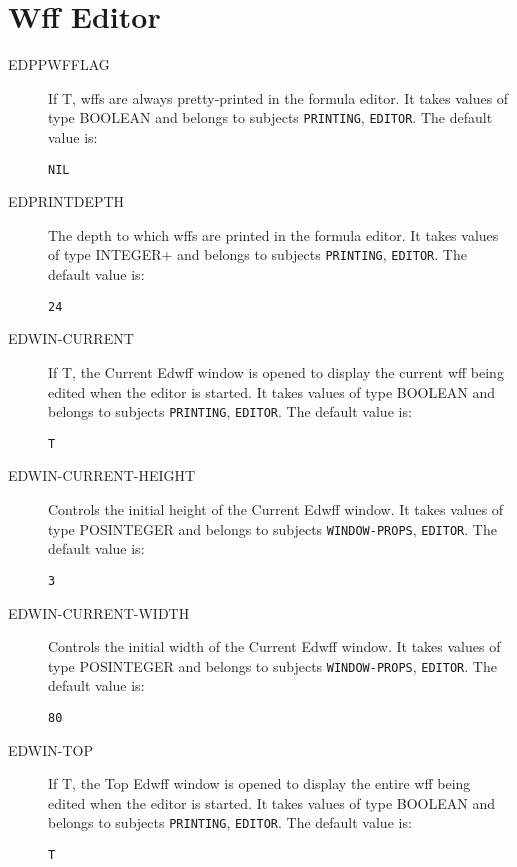 \section{Wff Editor}

\begin{description} 
\item[EDPPWFFLAG]  
If T, wffs are always pretty-printed in the formula editor.
It takes values of type BOOLEAN and belongs to subjects \texttt{PRINTING}, \texttt{EDITOR}.  The default value is: \begin{lstlisting}
NIL
\end{lstlisting}

\item[EDPRINTDEPTH]  
The depth to which wffs are printed in the formula editor.
It takes values of type INTEGER+ and belongs to subjects \texttt{PRINTING}, \texttt{EDITOR}.  The default value is: \begin{lstlisting}
24
\end{lstlisting}

\item[EDWIN-CURRENT]  
If T, the Current Edwff window is opened to display the current
   wff being edited when the editor is started.
It takes values of type BOOLEAN and belongs to subjects \texttt{PRINTING}, \texttt{EDITOR}.  The default value is: \begin{lstlisting}
T
\end{lstlisting}

\item[EDWIN-CURRENT-HEIGHT]  
Controls the initial height of the Current Edwff window.
It takes values of type POSINTEGER and belongs to subjects \texttt{WINDOW-PROPS}, \texttt{EDITOR}.  The default value is: \begin{lstlisting}
3
\end{lstlisting}

\item[EDWIN-CURRENT-WIDTH]  
Controls the initial width of the Current Edwff window.
It takes values of type POSINTEGER and belongs to subjects \texttt{WINDOW-PROPS}, \texttt{EDITOR}.  The default value is: \begin{lstlisting}
80
\end{lstlisting}

\item[EDWIN-TOP]  
If T, the Top Edwff window is opened to display the entire
   wff being edited when the editor is started.
It takes values of type BOOLEAN and belongs to subjects \texttt{PRINTING}, \texttt{EDITOR}.  The default value is: \begin{lstlisting}
T
\end{lstlisting}


\end{description}
